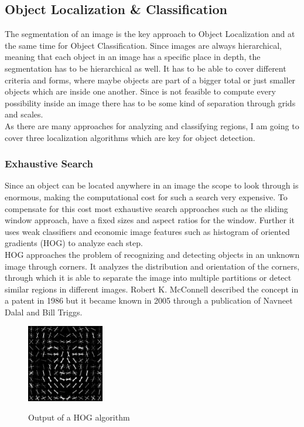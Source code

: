 \subsection{Object Localization \& Classification}
The segmentation of an image is the key approach to Object Localization and at the same time for Object Classification. Since images are
always hierarchical, meaning that each object in an image has a specific place in depth, the segmentation has to be hierarchical as well. It has to be able to cover different criteria and forms, where maybe
objects are part of a bigger total or just  smaller
objects which are inside one another. Since is not feasible to compute every possibility inside an image there has to be some kind of
separation through grids and scales. \\
As there are many approaches for analyzing and classifying regions, I am going to cover three localization algorithms which
are key for object detection.

\subsubsection{Exhaustive Search}
Since an object can be located anywhere in an image the scope to look through is enormous, making the computational cost for such a search very
expensive. To compensate for this cost most exhaustive search approaches such as the sliding window approach, have a fixed sizes and aspect
ratios for the window. Further it uses weak classifiers and economic image features such as histogram of oriented gradients
(HOG) to analyze each step.\cite{selectivesearch} \\ 
HOG approaches the problem of recognizing and detecting objects in an unknown image through corners. It analyzes the distribution and 
orientation of the corners, through which it is able to separate the image into multiple partitions or detect similar regions in different images.
Robert K. McConnell described the concept in a patent in 1986 but it became known in 2005 through a publication of Navneet Dalal and Bill
Triggs.\cite{hog}
\begin{figure}[!hbt]
    \caption{Output of a HOG algorithm}
    \begin{center}
        \includegraphics[width=0.3\textwidth]{images/object_detection/Dlib_Learned-HOG-Detector.jpg} \cite{hog}
    \end{center}
\end{figure}
